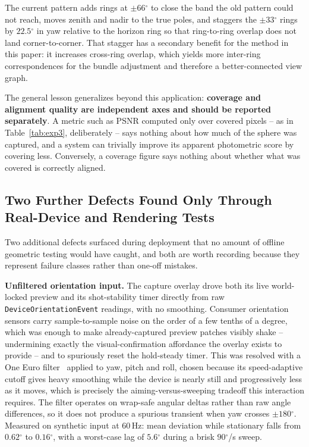 \documentclass[11pt]{article}
\newcommand{\Deg}{\ensuremath{^{\circ}}}
\begin{document}
The current pattern adds rings at $\pm66\Deg$ to close the band the old pattern could not reach, moves zenith and nadir to the true poles, and staggers the $\pm33\Deg$ rings by $22.5\Deg$ in yaw relative to the horizon ring so that ring-to-ring overlap does not land corner-to-corner. That stagger has a secondary benefit for the method in this paper: it increases cross-ring overlap, which yields more inter-ring correspondences for the bundle adjustment and therefore a better-connected view graph.

The general lesson generalizes beyond this application: \textbf{coverage and alignment quality are independent axes and should be reported separately}. A metric such as PSNR computed only over covered pixels -- as in Table~\ref{tab:exp3}, deliberately -- says nothing about how much of the sphere was captured, and a system can trivially improve its apparent photometric score by covering less. Conversely, a coverage figure says nothing about whether what was covered is correctly aligned.

\subsection{Two Further Defects Found Only Through Real-Device and Rendering Tests}

Two additional defects surfaced during deployment that no amount of offline geometric testing would have caught, and both are worth recording because they represent failure classes rather than one-off mistakes.

\textbf{Unfiltered orientation input.} The capture overlay drove both its live world-locked preview and its shot-stability timer directly from raw \texttt{DeviceOrientationEvent} readings, with no smoothing. Consumer orientation sensors carry sample-to-sample noise on the order of a few tenths of a degree, which was enough to make already-captured preview patches visibly shake -- undermining exactly the visual-confirmation affordance the overlay exists to provide -- and to spuriously reset the hold-steady timer. This was resolved with a One Euro filter~\cite{casiez2012oneeuro} applied to yaw, pitch and roll, chosen because its speed-adaptive cutoff gives heavy smoothing while the device is nearly still and progressively less as it moves, which is precisely the aiming-versus-sweeping tradeoff this interaction requires. The filter operates on wrap-safe angular deltas rather than raw angle differences, so it does not produce a spurious transient when yaw crosses $\pm180\Deg$. Measured on synthetic input at 60\,Hz: mean deviation while stationary falls from $0.62\Deg$ to $0.16\Deg$, with a worst-case lag of $5.6\Deg$ during a brisk $90\Deg$/s sweep.
\end{document}
